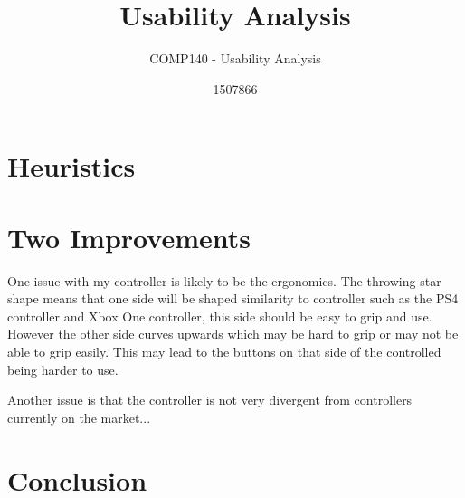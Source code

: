 \documentclass{scrartcl}
\title{Usability Analysis}
\subtitle{COMP140 - Usability Analysis}
\author{1507866}
\begin{document}
	
\maketitle
	

	
\section{Heuristics}


\section{Two Improvements}
One issue with my controller is likely to be the ergonomics. The throwing star shape means that one side will be shaped similarity to controller such as the PS4 controller and Xbox One controller, this side should be easy to grip and use. However the other side curves upwards which may be hard to grip or may not be able to grip easily. This may lead to the buttons on that side of the controlled being harder to use. 

Another issue is that the controller is not very divergent from controllers currently on the market...

\section{Conclusion}

	
	


	
\end{document}
